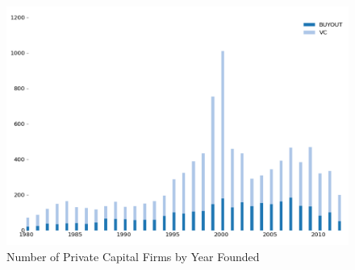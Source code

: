 
\begin{figure}[hbt]
    \centering
        \includegraphics[width=\widthpcriaa]{./figures/pcrifigurea1} 
        \caption{Number of Private Capital Firms by Year Founded}\label{fig:pcrifigurea1}
\end{figure}